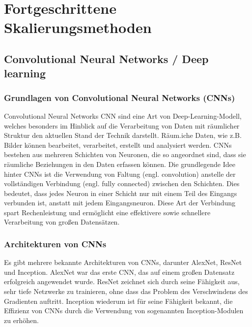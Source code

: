 


\chapter{Fortgeschrittene Skalierungsmethoden}
\section{Convolutional Neural Networks / Deep learning}
    \subsection{Grundlagen von Convolutional Neural Networks (CNNs)}
        Convolutional Neural Networks \ac{CNN} sind eine Art von Deep-Learning-Modell, welches besonders im Hinblick auf die Verarbeitung von Daten mit räumlicher Struktur den aktuellen Stand der Technik darstellt.      
        Räum.iche Daten, wie z.B.      Bilder können bearbeitet, verarbeitet, erstellt und analysiert werden.      
        CNNs bestehen aus mehreren Schichten von Neuronen, die so angeordnet sind, dass sie räumliche Beziehungen in den Daten erfassen können.
        Die grundlegende Idee hinter CNNs ist die Verwendung von Faltung (engl.      convolution) anstelle der vollständigen Verbindung (engl.      fully connected) zwischen den Schichten.      
        Dies bedeutet, dass jedes Neuron in einer Schicht nur mit einem Teil des Eingangs verbunden ist, anstatt mit jedem Eingangsneuron.      
        Diese Art der Verbindung spart Rechenleistung und ermöglicht eine effektivere sowie schnellere Verarbeitung von großen Datensätzen.
    \subsection{Architekturen von CNNs}
    
        Es gibt mehrere bekannte Architekturen von CNNs, darunter AlexNet, ResNet und Inception.      
        AlexNet war das erste CNN, das auf einem großen Datensatz erfolgreich angewendet wurde.      
        ResNet zeichnet sich durch seine Fähigkeit aus, sehr tiefe Netzwerke zu trainieren, ohne dass das Problem des Verschwindens des Gradienten auftritt.  
        Inception wiederum ist für seine Fähigkeit bekannt, die Effizienz von CNNs durch die Verwendung von sogenannten Inception-Modulen zu erhöhen.

